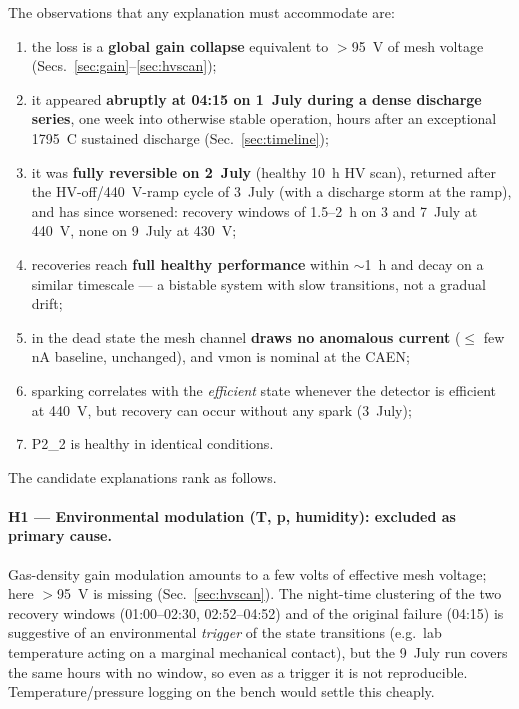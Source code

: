 \documentclass[11pt,a4paper]{article}
\newcommand{\dettwo}{P2\_2}
\begin{document}
The observations that any explanation must accommodate are:
\begin{enumerate}
  \item the loss is a \textbf{global gain collapse} equivalent to
        $>$95~V of mesh voltage (Secs.~\ref{sec:gain}--\ref{sec:hvscan});
  \item it appeared \textbf{abruptly at 04:15 on 1~July during a dense
        discharge series}, one week into otherwise stable operation, hours
        after an exceptional 1795~\textmu C sustained discharge
        (Sec.~\ref{sec:timeline});
  \item it was \textbf{fully reversible on 2~July} (healthy 10~h HV scan),
        returned after the HV-off/440~V-ramp cycle of 3~July (with a
        discharge storm at the ramp), and has since worsened: recovery
        windows of 1.5--2~h on 3 and 7~July at 440~V, none on 9~July at
        430~V;
  \item recoveries reach \textbf{full healthy performance} within
        $\sim$1~h and decay on a similar timescale --- a bistable system
        with slow transitions, not a gradual drift;
  \item in the dead state the mesh channel \textbf{draws no anomalous
        current} ($\leq$ few nA baseline, unchanged), and vmon is nominal at
        the CAEN;
  \item sparking correlates with the \emph{efficient} state whenever the
        detector is efficient at 440~V, but recovery can occur without any
        spark (3~July);
  \item \dettwo{} is healthy in identical conditions.
\end{enumerate}

\noindent The candidate explanations rank as follows.

\paragraph{H1 --- Environmental modulation (T, p, humidity): excluded as
primary cause.} Gas-density gain modulation amounts to a few volts of
effective mesh voltage; here $>$95~V is missing (Sec.~\ref{sec:hvscan}).
The night-time clustering of the two recovery windows (01:00--02:30,
02:52--04:52) and of the original failure (04:15) is suggestive of an
environmental \emph{trigger} of the state transitions (e.g.\ lab temperature
acting on a marginal mechanical contact), but the 9~July run covers the same
hours with no window, so even as a trigger it is not reproducible.
Temperature/pressure logging on the bench would settle this cheaply.
\end{document}
